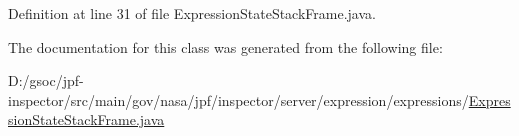 Definition at line 31 of file Expression\+State\+Stack\+Frame.\+java.



The documentation for this class was generated from the following file\+:\begin{DoxyCompactItemize}
\item 
D\+:/gsoc/jpf-\/inspector/src/main/gov/nasa/jpf/inspector/server/expression/expressions/\hyperlink{_expression_state_stack_frame_8java}{Expression\+State\+Stack\+Frame.\+java}\end{DoxyCompactItemize}
